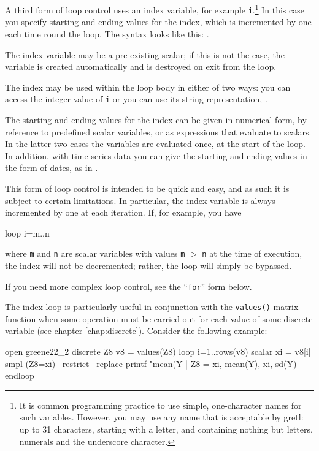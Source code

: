 A third form of loop control uses an index variable, for example
\verb+i+.\footnote{It is common programming practice to use simple,
  one-character names for such variables.  However, you may use any
  name that is acceptable by gretl: up to 31 characters, starting with
  a letter, and containing nothing but letters, numerals and the
  underscore character.}  In this case you specify starting and ending
values for the index, which is incremented by one each time round the
loop.  The syntax looks like this: .

The index variable may be a pre-existing scalar; if this is not the
case, the variable is created automatically and is destroyed on exit
from the loop.

The index may be used within the loop body in either of two ways: you
can access the integer value of \verb+i+ or you can use its string
representation, .

The starting and ending values for the index can be given in numerical
form, by reference to predefined scalar variables, or as expressions
that evaluate to scalars.  In the latter two cases the variables are
evaluated once, at the start of the loop.  In addition, with time
series data you can give the starting and ending values in the form of
dates, as in .

This form of loop control is intended to be quick and easy, and as
such it is subject to certain limitations. In particular, the index
variable is always incremented by one at each iteration.  If, for
example, you have
\begin{code}
loop i=m..n
\end{code}
where \texttt{m} and \texttt{n} are scalar variables with values
\texttt{m} $>$ \texttt{n} at the time of execution, the index will not
be decremented; rather, the loop will simply be bypassed.

If you need more complex loop control, see the ``\texttt{for}'' form
below.

The index loop is particularly useful in conjunction with the
\texttt{values()} matrix function when some operation must be carried
out for each value of some discrete variable (see chapter
\ref{chap:discrete}). Consider the following example:

\begin{code}
open greene22_2
discrete Z8
v8 = values(Z8)
loop i=1..rows(v8)
  scalar xi = v8[i]
  smpl (Z8=xi) --restrict --replace
  printf "mean(Y | Z8 = %
    xi, mean(Y), xi, sd(Y)
endloop
\end{code}

